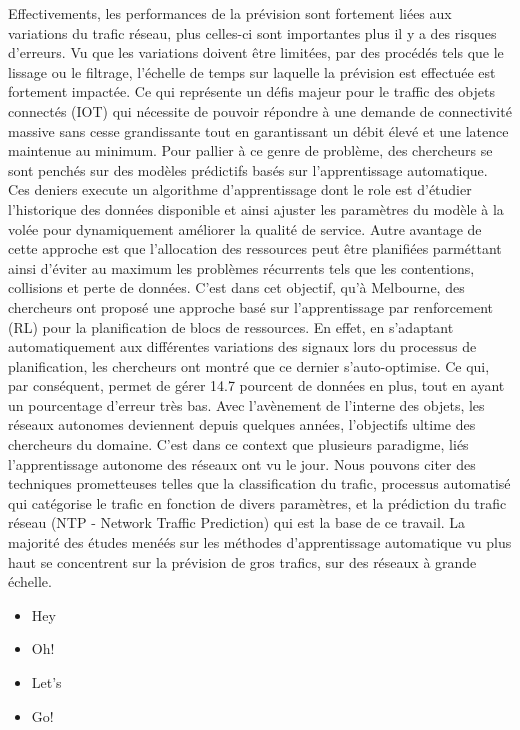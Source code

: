 \documentclass[12pt]{article}
\begin{document}
Effectivements, les performances de la prévision sont fortement liées aux variations du trafic réseau, plus celles-ci sont importantes plus il y a des risques d'erreurs. Vu que les variations doivent être limitées, par des procédés tels que le lissage ou le filtrage, l'échelle de temps sur laquelle la prévision est effectuée est fortement impactée.
Ce qui représente un défis majeur pour le traffic des objets connectés (IOT) qui nécessite de pouvoir répondre à une demande de connectivité massive sans cesse grandissante tout en garantissant un débit élevé et une latence maintenue au minimum.
Pour pallier à ce genre de problème, des chercheurs se sont penchés sur des modèles prédictifs basés sur l'apprentissage automatique. Ces deniers execute un algorithme d'apprentissage dont le role est d'étudier l'historique des données disponible et ainsi ajuster les paramètres du modèle à la volée pour dynamiquement améliorer la qualité de service.
Autre avantage de cette approche est que l'allocation des ressources peut être planifiées parméttant ainsi d'éviter au maximum les problèmes récurrents tels que les contentions, collisions et perte de données.
C'est dans cet objectif, qu'à Melbourne, des chercheurs ont proposé une approche basé sur l'apprentissage par renforcement (RL) pour la planification de blocs de ressources. 
En effet, en s'adaptant automatiquement aux différentes variations des signaux lors du processus de planification, les chercheurs ont montré que ce dernier s'auto-optimise. Ce qui, par conséquent, permet de gérer 14.7 pourcent de données en plus, tout en ayant un pourcentage d'erreur très bas. 
Avec l'avènement de l'interne des objets, les réseaux autonomes deviennent depuis quelques années, l'objectifs ultime des chercheurs du domaine. C'est dans ce context que plusieurs paradigme, liés l'apprentissage autonome des réseaux ont vu le jour.
Nous pouvons citer des techniques prometteuses telles que la classification du trafic, processus automatisé qui catégorise le trafic en fonction de divers paramètres, et la prédiction du trafic réseau (NTP - Network Traffic Prediction) qui est la base de ce travail.
La majorité des études menéés sur les méthodes d'apprentissage automatique vu plus haut se concentrent sur la prévision de gros trafics, sur des réseaux à grande échelle. 

\begin{itemize}

    \item Hey
    
    \item Oh!
    
    \item Let’s
    
    \item Go!
    
    \end{itemize}
    
    
\end{document}

